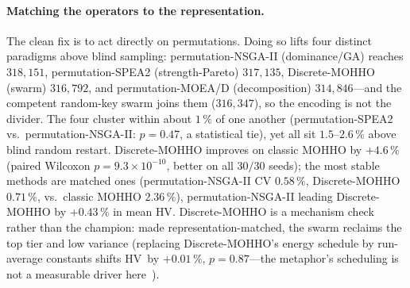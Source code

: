 \documentclass[runningheads]{llncs}
\newcommand{\HV}{\textsf{HV}}
\begin{document}
\paragraph{Matching the operators to the representation.}
The clean fix is to act directly on permutations. Doing so lifts four distinct paradigms above blind sampling: permutation-NSGA-II (dominance/GA) reaches $318{,}151$, permutation-SPEA2 (strength-Pareto) $317{,}135$, Discrete-MOHHO (swarm) $316{,}792$, and permutation-MOEA/D (decomposition) $314{,}846$---and the competent random-key swarm joins them ($316{,}347$), so the encoding is not the divider. The four cluster within about $1\,\%$ of one another (permutation-SPEA2 vs.\ permutation-NSGA-II: $p=0.47$, a statistical tie), yet all sit $1.5$--$2.6\,\%$ above blind random restart. Discrete-MOHHO improves on classic MOHHO by $+4.6\,\%$ (paired Wilcoxon $p=9.3\times10^{-10}$, better on all $30/30$ seeds); the most stable methods are matched ones (permutation-NSGA-II CV $0.58\,\%$, Discrete-MOHHO $0.71\,\%$, vs.\ classic MOHHO $2.36\,\%$), permutation-NSGA-II leading Discrete-MOHHO by $+0.43\,\%$ in mean \HV. Discrete-MOHHO is a mechanism check rather than the champion: made representation-matched, the swarm reclaims the top tier and low variance (replacing Discrete-MOHHO's energy schedule by run-average constants shifts \HV\ by $+0.01\,\%$, $p=0.87$---the metaphor's scheduling is not a measurable driver here~\cite{aranha,sorensen}).
\end{document}
